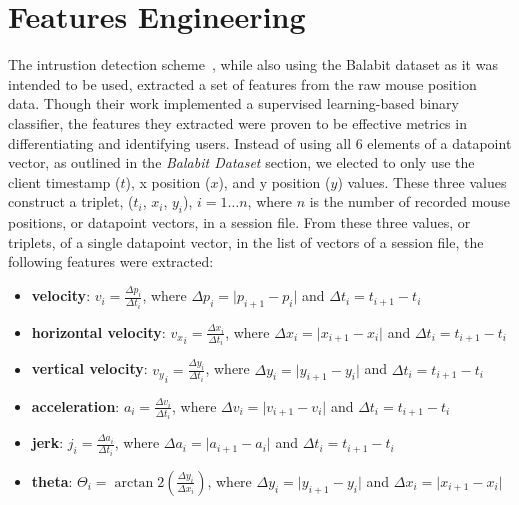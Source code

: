 \section{Features Engineering}\label{sec:features-engineering}
The intrustion detection scheme~\cite{intrustion_detection_using_mouse_dynamics}, while also using the Balabit dataset as it was intended to be used, extracted a set of features from the raw mouse position data.
Though their work implemented a supervised learning-based binary classifier, the features they extracted were proven to be effective metrics in differentiating and identifying users.
Instead of using all 6 elements of a datapoint vector, as outlined in the \textit{Balabit Dataset} section, we elected to only use the client timestamp ($t$), x position ($x$), and y position ($y$) values.
These three values construct a triplet, ($t_i$, $x_i$, $y_i$), $i = 1{\dots}n$, where $n$ is the number of recorded mouse positions, or datapoint vectors, in a session file.
From these three values, or triplets, of a single datapoint vector, in the list of vectors of a session file, the following features were extracted:
\begin{itemize}
    \item \textbf{velocity}: $v_i = \frac{\Delta p_i}{\Delta t_i}$, where $\Delta p_i = \lvert p_{i+1} - p_i \rvert$ and $\Delta t_i = t_{i+1} - t_i$
    \item \textbf{horizontal velocity}: ${v_x}_i = \frac{\Delta x_i}{\Delta t_i}$, where $\Delta x_i = \lvert x_{i+1} - x_i \rvert$ and $\Delta t_i = t_{i+1} - t_i$
    \item \textbf{vertical velocity}: ${v_y}_i = \frac{\Delta y_i}{\Delta t_i}$, where $\Delta y_i = \lvert y_{i+1} - y_i \rvert$ and $\Delta t_i = t_{i+1} - t_i$
    \item \textbf{acceleration}: $a_i = \frac{\Delta v_i}{\Delta t_i}$, where $\Delta v_i = \lvert v_{i+1} - v_i \rvert$ and $\Delta t_i = t_{i+1} - t_i$
    \item \textbf{jerk}: $j_i = \frac{\Delta a_i}{\Delta t_i}$, where $\Delta a_i = \lvert a_{i+1} - a_i \rvert$ and $\Delta t_i = t_{i+1} - t_i$
    \item \textbf{theta}: $\Theta _i = \arctan 2(\frac{\Delta y_i}{\Delta x_i})$, where $\Delta y_i = \lvert y_{i+1} - y_i \rvert$ and $\Delta x_i = \lvert x_{i+1} - x_i \rvert$
\end{itemize}

